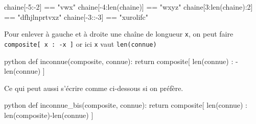 

\begin{solution}
\vspace{-\baselineskip}
\begin{idleconsole}
\begin{pyconsole}
chaine[-5:-2] == "vwx"
chaine[-4:len(chaine)] == "wxyz"
chaine[3:len(chaine):2] == "dfhjlnprtvxz"
chaine[-3::-3] == "xurolifc"
\end{pyconsole}
\end{idleconsole}
\end{solution}

\begin{solution}
Pour enlever à gauche et à droite une chaîne de longueur \texttt{x}, on peut faire \texttt{composite[ x : -x ]}
or ici \texttt{x} vaut \texttt{len(connue)}

\begin{listingbox}{python}
def inconnue(composite, connue):
    return composite[ len(connue) : -len(connue) ]
\end{listingbox}

Ce qui peut aussi s'écrire comme ci-dessous si on préfère.
\begin{listingbox}{python}
def inconnue_bis(composite, connue):
    return composite[ len(connue) : len(composite)-len(connue) ]
\end{listingbox}
\end{solution}

\vspace{6pt}

